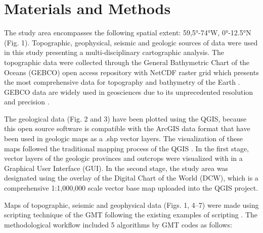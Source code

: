 \documentclass[sustainability,article,submit,pdftex,moreauthors]{Definitions/mdpi}
\begin{document}
\section{Materials and Methods}

The study area encompasses the following spatial extent: 59,5°-74°W, 0°-12.5°N (Fig. 1). Topographic, geophysical, seismic and geologic sources of data were used in this study presenting a multi-disciplinary cartographic analysis. The topographic data were collected through the General Bathymetric Chart of the Oceans (GEBCO) open access repository with NetCDF raster grid \cite{GEBCO} which presents the most comprehensive data for topography and bathymetry of the Earth \cite{Schenke}. GEBCO data are widely used in geosciences due to its unprecedented resolution and precision \citep{Mcmichael,Lemenkova2020c,Lemenkova2022c,Cortina}. 

The geological data (Fig. 2 and 3) have been plotted using the QGIS, because this open source software is compatible with the ArcGIS data format that have been used in geologic maps as a .shp vector layers. The visualization of these maps followed the traditional mapping process of the QGIS \cite{Lemenkova2022a}. In the first stage, vector layers of the geologic provinces and outcrops were visualized with in a Graphical User Interface (GUI). In the second stage, the study area was designated using the overlay of the Digital Chart of the World (DCW), which is a comprehensive 1:1,000,000 scale vector base map uploaded into the QGIS project. 

Maps of topographic, seismic and geophysical data (Figs. 1, 4–7) were made using scripting technique of the GMT \cite{Wessel} following the existing examples of scripting \citep{Lemenkova2019a,Lemenkova2022b}. The methodological workflow included 5 algorithms by GMT codes as follows: 
\end{document}
